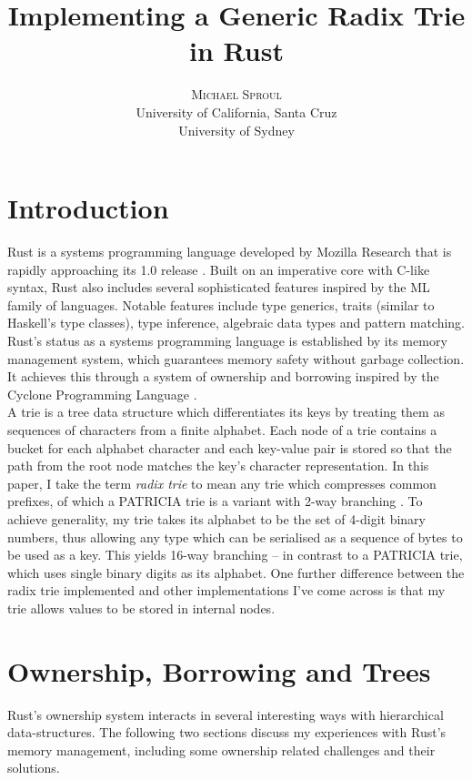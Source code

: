 \documentclass[a4paper,12pt]{article}
\title{
Implementing a Generic Radix Trie in Rust
}
\author{
\textsc{Michael Sproul}\\
University of California, Santa Cruz\\
University of Sydney
}
\date{}
\begin{document}
\maketitle

\section{Introduction}

Rust is a systems programming language developed by Mozilla Research that is rapidly approaching its 1.0 release \cite{rust-homepage}. Built on an imperative core with C-like syntax, Rust also includes several sophisticated features inspired by the ML family of languages. Notable features include type generics, traits (similar to Haskell's type classes), type inference, algebraic data types and pattern matching.  Rust's status as a systems programming language is established by its memory management system, which guarantees memory safety without garbage collection. It achieves this through a system of ownership and borrowing inspired by the Cyclone Programming Language \cite{cyclone}.\\

A trie is a tree data structure which differentiates its keys by treating them as sequences of characters from a finite alphabet. Each node of a trie contains a bucket for each alphabet character and each key-value pair is stored so that the path from the root node matches the key's character representation. In this paper, I take the term \textit{radix trie} to mean any trie which compresses common prefixes, of which a PATRICIA trie is a variant with 2-way branching \cite{morrison1968}. To achieve generality, my trie takes its alphabet to be the set of 4-digit binary numbers, thus allowing any type which can be serialised as a sequence of bytes to be used as a key. This yields 16-way branching -- in contrast to a PATRICIA trie, which uses single binary digits as its alphabet. One further difference between the radix trie implemented and other implementations I've come across is that my trie allows values to be stored in internal nodes.

\section{Ownership, Borrowing and Trees}

Rust's ownership system \cite{book-ownership} interacts in several interesting ways with hierarchical data-structures. The following two sections discuss my experiences with Rust's memory management, including some ownership related challenges and their solutions.
\end{document}

